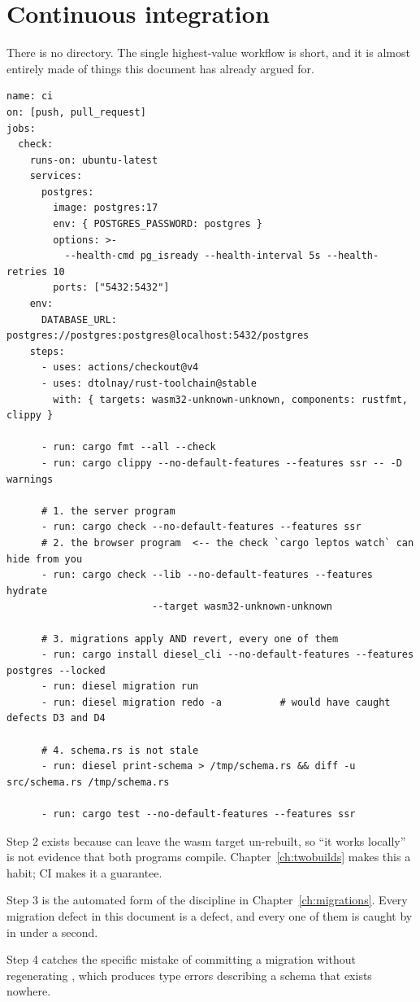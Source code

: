 \section{Continuous integration}

There is no  directory. The single highest-value workflow is short, and it is
almost entirely made of things this document has already argued for.

\begin{lstlisting}[style=sh,caption={\file{.github/workflows/ci.yml} --- the five checks that matter.}]
name: ci
on: [push, pull_request]
jobs:
  check:
    runs-on: ubuntu-latest
    services:
      postgres:
        image: postgres:17
        env: { POSTGRES_PASSWORD: postgres }
        options: >-
          --health-cmd pg_isready --health-interval 5s --health-retries 10
        ports: ["5432:5432"]
    env:
      DATABASE_URL: postgres://postgres:postgres@localhost:5432/postgres
    steps:
      - uses: actions/checkout@v4
      - uses: dtolnay/rust-toolchain@stable
        with: { targets: wasm32-unknown-unknown, components: rustfmt, clippy }

      - run: cargo fmt --all --check
      - run: cargo clippy --no-default-features --features ssr -- -D warnings

      # 1. the server program
      - run: cargo check --no-default-features --features ssr
      # 2. the browser program  <-- the check `cargo leptos watch` can hide from you
      - run: cargo check --lib --no-default-features --features hydrate
                         --target wasm32-unknown-unknown

      # 3. migrations apply AND revert, every one of them
      - run: cargo install diesel_cli --no-default-features --features postgres --locked
      - run: diesel migration run
      - run: diesel migration redo -a          # would have caught defects D3 and D4

      # 4. schema.rs is not stale
      - run: diesel print-schema > /tmp/schema.rs && diff -u src/schema.rs /tmp/schema.rs

      - run: cargo test --no-default-features --features ssr
\end{lstlisting}

\begin{why}
Step 2 exists because  can leave the wasm target un-rebuilt, so ``it works
locally'' is not evidence that both programs compile. Chapter~\ref{ch:twobuilds} makes this a habit;
CI makes it a guarantee.

Step 3 is the automated form of the discipline in Chapter~\ref{ch:migrations}. Every migration
defect in this document is a  defect, and every one of them is caught by
 in under a second.

Step 4 catches the specific mistake of committing a migration without regenerating
, which produces type errors describing a schema that exists nowhere.
\end{why}


